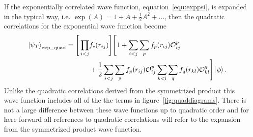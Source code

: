 If the exponentially correlated wave function, equation~\ref{equ:exppsi}, is expanded in the typical way, i.e. $\exp(A) = 1 + A + \frac{1}{2}A^2 + \ldots$, then the quadratic correlations for the exponential wave function become
\begin{equation}
   \begin{split}
      \left| \psi_T \right>_\text{exp\_quad} = \Bigg[\prod\limits_{i<j}&f_c(r_{ij})\Bigg] \Bigg[1+\sum\limits_{i<j}\sum\limits_p f_p(r_{ij})\mathcal{O}_{ij}^p \\
         & + \frac{1}{2}\sum\limits_{i<j}\sum\limits_p f_p(r_{ij})\mathcal{O}_{ij}^p\sum_{\substack{k<l}}\sum\limits_q f_q(r_{kl})\mathcal{O}_{kl}^q \Bigg] \left| \phi \right>.
   \end{split}
   \label{equ:expquadcorr}
\end{equation}
Unlike the quadratic correlations derived from the symmetrized product this wave function includes all of the the terms in figure~\ref{fig:quaddiagrams}. There is not a large difference between these wave functions up to quadratic order and for here forward all references to quadratic correlations will refer to the expansion from the symmetrized product wave function.

